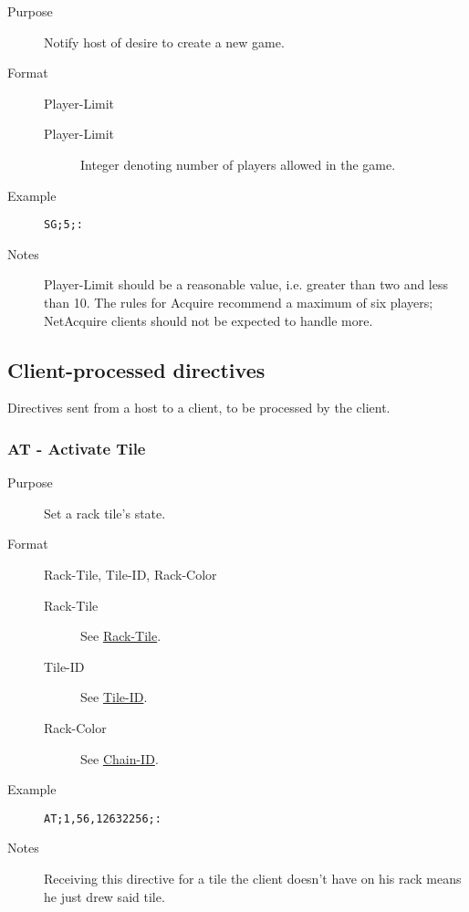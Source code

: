 \documentclass{article}
\providecommand{\wiredata}[1]{\texttt{{#1}}}
\begin{document}
\begin{description}
  \item[Purpose] Notify host of desire to create a new game.
  \item[Format] Player-Limit
  \begin{description}
    \item[Player-Limit] Integer denoting number of players allowed in the game.
  \end{description}
  \item[Example] \wiredata{SG;5;:}
  \item[Notes] Player-Limit should be a reasonable value, i.e. greater than two and less than 10. The rules for Acquire recommend a maximum of six players; NetAcquire clients should not be expected to handle more.
\end{description}



\subsection{Client-processed directives} %
\label{sub:client_processed_directives}

Directives sent from a host to a client, to be processed by the client.

\subsubsection{AT - Activate Tile} %
\label{ssub:at_activate_tile}

\begin{description}
  \item[Purpose] Set a rack tile's state.
  \item[Format] Rack-Tile, Tile-ID, Rack-Color
  \begin{description}
    \item[Rack-Tile] See \hyperref[ssub:rack_tile]{Rack-Tile}.
    \item[Tile-ID] See \hyperref[ssub:tile_id]{Tile-ID}.
    \item[Rack-Color] See \hyperref[ssub:chain_id]{Chain-ID}.
  \end{description}
  \item[Example] \wiredata{AT;1,56,12632256;:}
  \item[Notes] Receiving this directive for a tile the client doesn't have on his rack means he just drew said tile.
\end{description}
\end{document}
